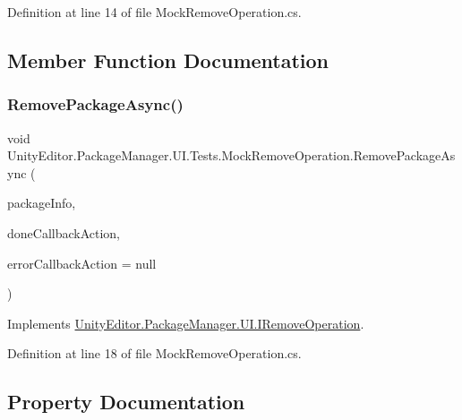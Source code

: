 Definition at line 14 of file Mock\+Remove\+Operation.\+cs.



\subsection{Member Function Documentation}
\mbox{\label{class_unity_editor_1_1_package_manager_1_1_u_i_1_1_tests_1_1_mock_remove_operation_a6eb0a7297483a1f4a62cbbc890f0b843}} 
\subsubsection{\texorpdfstring{RemovePackageAsync()}{RemovePackageAsync()}}
{\footnotesize\ttfamily void Unity\+Editor.\+Package\+Manager.\+U\+I.\+Tests.\+Mock\+Remove\+Operation.\+Remove\+Package\+Async (\begin{DoxyParamCaption}\item[{\mbox{\hyperlink{class_unity_editor_1_1_package_manager_1_1_u_i_1_1_package_info}{Package\+Info}}}]{package\+Info,  }\item[{Action$<$ \mbox{\hyperlink{class_unity_editor_1_1_package_manager_1_1_u_i_1_1_package_info}{Package\+Info}} $>$}]{done\+Callback\+Action,  }\item[{Action$<$ Error $>$}]{error\+Callback\+Action = {\ttfamily null} }\end{DoxyParamCaption})}



Implements \mbox{\hyperlink{interface_unity_editor_1_1_package_manager_1_1_u_i_1_1_i_remove_operation_a83f4739b21051b92ceb18336953a6af1}{Unity\+Editor.\+Package\+Manager.\+U\+I.\+I\+Remove\+Operation}}.



Definition at line 18 of file Mock\+Remove\+Operation.\+cs.



\subsection{Property Documentation}
\mbox{\label{class_unity_editor_1_1_package_manager_1_1_u_i_1_1_tests_1_1_mock_remove_operation_af67f49d662205ef776d9ecfa598705d2}} 

